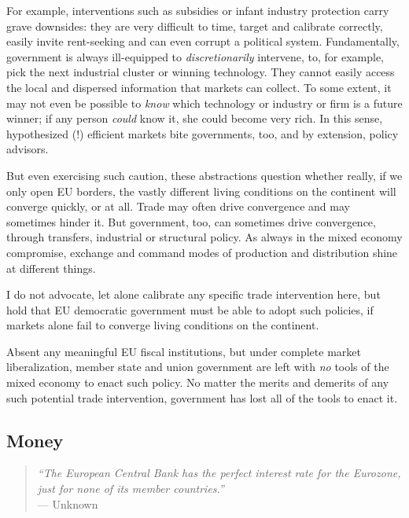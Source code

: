 \documentclass[11pt,a4paper,oneside]{article}
\begin{document}
\begin{enumerate}
	For example, interventions such as subsidies or infant industry protection carry grave downsides: 
	they are very difficult to time, target and calibrate correctly, easily invite rent-seeking and can even corrupt a political system. 
	Fundamentally, government is always ill-equipped to \emph{discretionarily} intervene, to, for example, pick the next industrial cluster or winning technology. 
	They cannot easily access the local and dispersed information that markets can collect. 
	To some extent, it may not even be possible to \emph{know} which technology or industry or firm is a future winner; if any person \emph{could} know it, she could become very rich. 
	In this sense, hypothesized (!) efficient markets bite governments, too, and by extension, policy advisors.

\end{enumerate}

But even exercising such caution, these abstractions question whether really, if we only open \gls{EU} borders, the vastly different living conditions on the continent will converge quickly, or at all. 
Trade may often drive convergence and may sometimes hinder it. 
But government, too, can sometimes drive convergence, through transfers, industrial or structural policy. 
As always in the mixed economy compromise, exchange and command modes of production and distribution shine at different things.

I do not advocate, let alone calibrate any specific trade intervention here, but hold that \gls{EU} democratic government must be able to adopt such policies, if markets alone fail to converge living conditions on the continent.

Absent any meaningful \gls{EU} fiscal institutions, but under complete market liberalization, member state and union government are left with \emph{no} tools of the mixed economy to enact such policy. 
No matter the merits and demerits of any such potential trade intervention, government has lost all of the tools to enact it.

\subsection{Money}

\begin{quote}
	\emph{``The European Central Bank has the perfect interest rate for the Eurozone, just for none of its member countries.''}\\
	--- Unknown
\end{quote}
\end{document}
